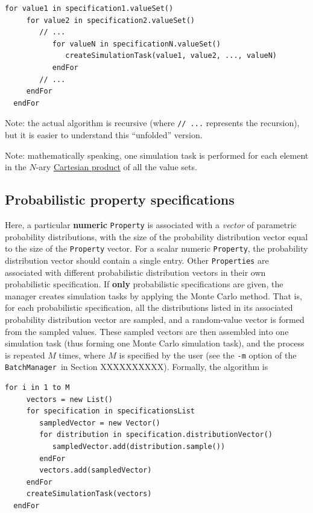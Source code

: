 \documentclass{article}
\newcommand{\BM}{{\tt BatchManager}}
\begin{document}
\begin{lstlisting}[]
  for value1 in specification1.valueSet()
     for value2 in specification2.valueSet()
        // ...
           for valueN in specificationN.valueSet()
              createSimulationTask(value1, value2, ..., valueN)
           endFor
        // ...
     endFor
  endFor
\end{lstlisting}

\begin{sideblock}
Note: the actual algorithm is recursive (where {\tt // ...} represents the recursion), but it is easier to understand this ``unfolded'' version.
\end{sideblock}

\begin{sideblock}
Note: mathematically speaking, one simulation task is performed for each element in the $N$-ary \href{https://en.wikipedia.org/wiki/Cartesian_product}{Cartesian product} of all the value sets.
\end{sideblock}

\subsection{Probabilistic property specifications}

Here, a particular \textbf{numeric} {\tt Property} is associated with a \textit{vector} of parametric probability distributions, with the size of the probability distribution vector equal to the size of the {\tt Property} vector. For a scalar numeric {\tt Property}, the probability distribution vector should contain a single entry. Other {\tt Properties} are associated with different probabilistic distribution vectors in their own probabilistic specification. If \textbf{only} probabilistic specifications are given, the manager creates simulation tasks by applying the Monte Carlo method. That is, for each probabilistic specification, all the distributions listed in its associated probability distribution vector are sampled, and a random-value vector is formed from the sampled values. These sampled vectors are then assembled into one simulation task (thus forming one Monte Carlo simulation task), and the process is repeated $M$ times, where $M$ is specified by the user (see the {\tt -m} option of the \BM\ in Section XXXXXXXXXX). Formally, the algorithm is

\begin{lstlisting}[]
  for i in 1 to M
     vectors = new List()
     for specification in specificationsList
        sampledVector = new Vector()
        for distribution in specification.distributionVector()
           sampledVector.add(distribution.sample())
        endFor
        vectors.add(sampledVector)
     endFor
     createSimulationTask(vectors)
  endFor
\end{lstlisting}
\end{document}
